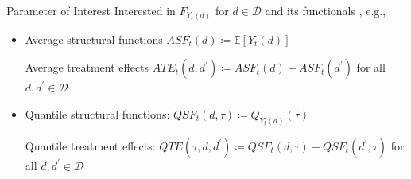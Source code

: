 \documentclass[aspectratio=1610, 9pt]{beamer}
\begin{document}
\begin{frame}{Parameter of Interest}
     Interested in $F_{Y_{t}(d)}$ for $d\in\mathcal{D}$ and its functionals , e.g.,
    
    \vspace{0.3cm}

\begin{itemize}
    \item Average structural functions $ASF_{t}(d)\coloneqq\mathbb{E}[Y_{t}(d)]$\\ 
    \vspace{0.2cm}

    Average treatment effects $ATE_t(d,d^{\prime})\coloneqq ASF_{t}(d)-ASF_{t}(d^{\prime})$ for all $d,d^{\prime}\in\mathcal{D}$

\vspace{0.2cm}
\item Quantile structural functions: $QSF_{t}(d,\tau)\coloneqq Q_{Y_{t}(d)}(\tau)$\\
\vspace{0.2cm}

Quantile treatment effects: $QTE(\tau,d,d^{\prime})\coloneqq QSF_{t}(d,\tau)-QSF_{t}(d^{\prime},\tau)$ for all $d,d^{\prime}\in\mathcal{D}$
\end{itemize} 

\end{frame}




    

\end{document}
